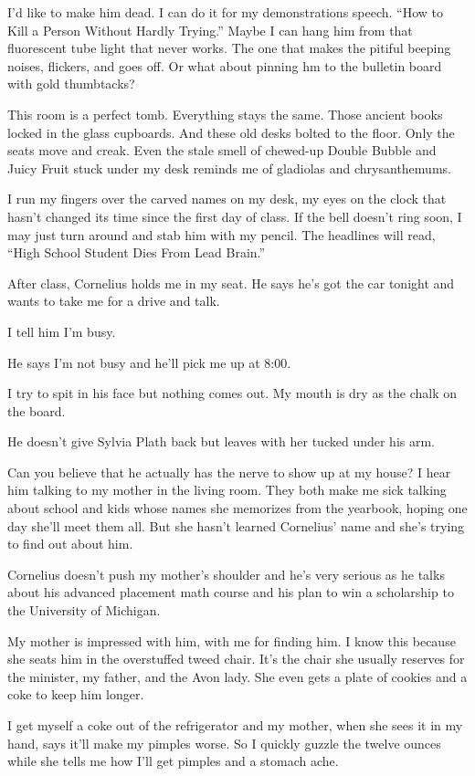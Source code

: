 \documentclass[
]{article}
\begin{document}
I'd like to make him dead. I can do it for my demonstrations speech.
``How to Kill a Person Without Hardly Trying.'' Maybe I can hang him
from that fluorescent tube light that never works. The one that makes
the pitiful beeping noises, flickers, and goes off. Or what about
pinning hm to the bul­letin board with gold thumbtacks?

This room is a perfect tomb. Everything stays the same. Those ancient
books locked in the glass cupboards. And these old desks bolted to the
floor. Only the seats move and creak. Even the stale smell of chewed-up
Double Bubble and Juicy Fruit stuck under my desk reminds me of
gladiolas and chrysanthemums.

I run my fingers over the carved names on my desk, my eyes on the clock
that hasn't changed its time since the first day of class. If the bell
doesn't ring soon, I may just turn around and stab him with my pencil.
The headlines will read, ``High School Student Dies From Lead Brain.''

After class, Cornelius holds me in my seat. He says he's got the car
tonight and wants to take me for a drive and talk.

I tell him I'm busy.

He says I'm not busy and he'll pick me up at 8:00.

I try to spit in his face but nothing comes out. My mouth is dry as the
chalk on the board.

He doesn't give Sylvia Plath back but leaves with her tucked under his
arm.

Can you believe that he actually has the nerve to show up at my house? I
hear him talking to my mother in the living room. They both make me sick
talking about school and kids whose names she memorizes from the
yearbook, hoping one day she'll meet them all. But she hasn't learned
Cornelius' name and she's trying to find out about him.

Cornelius doesn't push my mother's shoulder and he's very serious as he
talks about his advanced placement math course and his plan to win a
scholarship to the University of Michigan.

My mother is impressed with him, with me for finding him. I know this
because she seats him in the overstuffed tweed chair. It's the chair she
usually reserves for the minister, my father, and the Avon lady. She
even gets a plate of cookies and a coke to keep him longer.

I get myself a coke out of the refrigerator and my mother, when she sees
it in my hand, says it'll make my pimples worse. So I quickly guzzle the
twelve ounces while she tells me how I'll get pimples and a stomach
ache.
\end{document}
